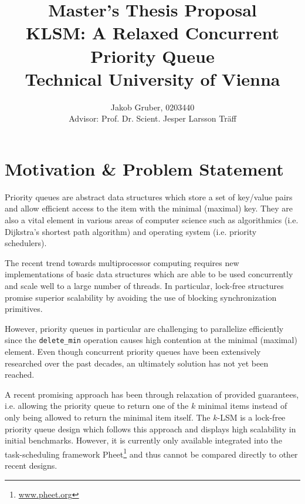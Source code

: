 \documentclass[a4paper,10pt]{article}
\title{Master's Thesis Proposal \\
       KLSM: A Relaxed Concurrent Priority Queue \\
       Technical University of Vienna}
\author{Jakob Gruber, 0203440 \\
        Advisor: Prof. Dr. Scient. Jesper Larsson Tr\"aff}
\begin{document}
\maketitle

\begin{comment}
http://www.informatik.tuwien.ac.at/dekanat/abschluss-master

Der Anmeldung der Diplomarbeit ist ein Abstract beizufügen. Das Abstract muss strukturiert in
i) Problemstellung,
ii) erwartetes Resultat,
iii) methodisches Vorgehen,
iv) State-of-the art (inkl. mind. vier Literaturreferenzen) sowie
v) Bezug zum angeführten Studium
abgefasst werden.

Bsp 1: http://www.informatik.tuwien.ac.at/dekanat/Abstract1.pdf
Bsp 2: http://www.informatik.tuwien.ac.at/dekanat/Abstract2.pdf
\end{comment}

\section{Motivation \& Problem Statement}

Priority queues are abstract data structures which store a set of key/value
pairs and allow efficient access to the item with the minimal (maximal) key.
They are also a vital element in various areas of computer science such as
algorithmics (i.e. Dijkstra's shortest path algorithm) and operating system
(i.e. priority schedulers).

The recent trend towards multiprocessor computing requires new implementations
of basic data structures which are able to be used concurrently and scale well
to a large number of threads. In particular, lock-free structures promise
superior scalability by avoiding the use of blocking synchronization
primitives.

However, priority queues in particular are challenging to parallelize
efficiently since the \lstinline|delete_min| operation causes high contention
at the minimal (maximal) element.  Even though concurrent priority queues have
been extensively researched over the past decades, an ultimately solution has
not yet been reached.

A recent promising approach has been through relaxation of provided guarantees,
i.e.  allowing the priority queue to return one of the $k$ minimal items
instead of only being allowed to return the minimal item itself. The $k$-LSM is
a lock-free priority queue design which follows this approach and displays high
scalability in initial benchmarks. However, it is currently only available
integrated into the task-scheduling framework
Pheet\footnote{\url{www.pheet.org}} and thus cannot be compared directly to
other recent designs.
\end{document}
